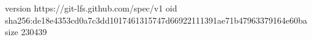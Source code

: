 version https://git-lfs.github.com/spec/v1
oid sha256:de18e4353cd0a7c3dd1017461315747d66922111391ae71b47963379164e60ba
size 230439
